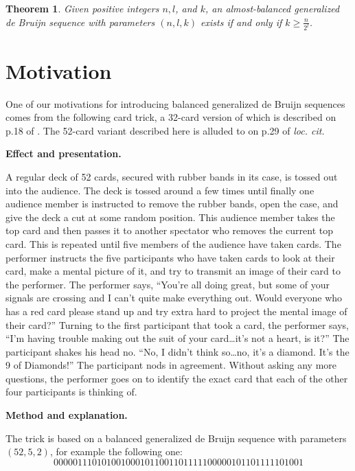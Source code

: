 \documentclass{article}
\theoremstyle{plain}
\newtheorem{theorem}{Theorem}
\theoremstyle{definition}
\theoremstyle{remark}
\begin{document}
\begin{theorem}\label{genmainresult}
Given positive integers $n,l$, and $k$, an almost-balanced generalized de Bruijn sequence with parameters $(n,l,k)$ exists if and only if $k \geqslant \frac{n}{2^l}$.
\end{theorem}

\section{Motivation} \label{sec:motivation}


One of our motivations for introducing balanced generalized de Bruijn sequences comes from the following card trick, a 32-card version of which is described on p.18 of \cite{Diaconis-Graham}. The 52-card variant described here is alluded to on p.29 of {\em loc. cit.}

\medskip

{\bf Effect and presentation.}

A regular deck of 52 cards, secured with rubber bands in its case, is tossed out into the audience. The deck is tossed around a few times until finally one audience member is instructed to remove the rubber bands, open the case, and give the deck a cut at some random position. This audience member takes the top card and then passes it to another spectator who removes the current top card. This is repeated until five members of the audience have taken cards. The performer instructs the five participants who have taken cards to look at their card, make a mental picture of it, and try to transmit an image of their card to the performer. The performer says, ``You're all doing great, but some of your signals are crossing and I can't quite make everything out. Would everyone who has a red card please stand up and try extra hard to project the mental image of their card?'' Turning to the first participant that took a card, the performer says, ``I'm having trouble making out the suit of your card\ldots it's not a heart, is it?'' The participant shakes his head no. ``No, I didn't think so\ldots no, it's a diamond. It's the 9 of Diamonds!'' The participant nods in agreement. Without asking any more questions, the performer goes on to identify the exact card that each of the other four participants is thinking of.

\medskip

{\bf Method and explanation.}

The trick is based on a balanced generalized de Bruijn sequence with parameters $(52,5,2)$, for example the following one:
\[
0000011101010010001011001101111100000101101111101001
\]
\end{document}
